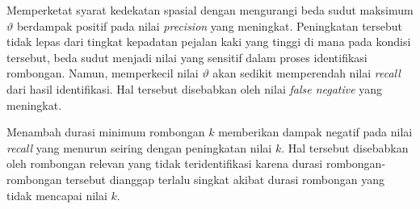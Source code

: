 Memperketat syarat kedekatan spasial dengan mengurangi beda sudut maksimum $\vartheta$ berdampak positif pada nilai \textit{precision} yang meningkat. Peningkatan tersebut tidak lepas dari tingkat kepadatan pejalan kaki yang tinggi di mana pada kondisi tersebut, beda sudut menjadi nilai yang sensitif dalam proses identifikasi rombongan. Namun, memperkecil nilai $\vartheta$ akan sedikit memperendah nilai \textit{recall} dari hasil identifikasi. Hal tersebut disebabkan oleh nilai \textit{false negative} yang meningkat.

Menambah durasi minimum rombongan $k$ memberikan dampak negatif pada nilai \textit{recall} yang menurun seiring dengan peningkatan nilai $k$. Hal tersebut disebabkan oleh rombongan relevan yang tidak teridentifikasi karena durasi rombongan-rombongan tersebut dianggap terlalu singkat akibat durasi rombongan yang tidak mencapai nilai $k$.

